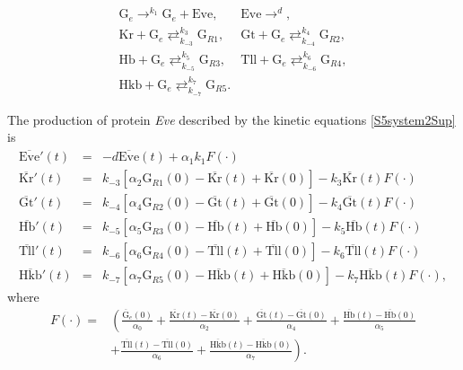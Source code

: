 \documentclass[final,authoryear, 5p, times]{elsarticle}
\begin{document}
\begin{equation}  \label{S5system2Sup}
    \begin{array}{ll}
        \displaystyle
        \text{G}_e \mathop{\longrightarrow}^{k_{1}} \text{G}_e + \text{Eve}, & \displaystyle
        \text{Eve} \mathop{\longrightarrow}^{d}, \\ \displaystyle
        \text{Kr} + \text{G}_e \mathop{\rightleftarrows}^{k_{3}}_{k_{-3}} \text{G}_{R1} ,& \displaystyle
        \text{Gt} + \text{G}_e \mathop{\rightleftarrows}^{k_{4}}_{k_{-4}} \text{G}_{R2}, \\ \displaystyle
        \text{Hb} + \text{G}_e \mathop{\rightleftarrows}^{k_{5}}_{k_{-5}} \text{G}_{R3}, & \displaystyle
        \text{Tll} + \text{G}_e \mathop{\rightleftarrows}^{k_{6}}_{k_{-6}} \text{G}_{R4},\\ \displaystyle
        \text{Hkb} + \text{G}_e \mathop{\rightleftarrows}^{k_{7}}_{k_{-7}} \text{G}_{R5} .&
    \end{array}
\end{equation}

The production of protein \textit{Eve} described by the kinetic equations \eqref{S5system2Sup} is
$$
\begin{array}{lcl}
    \overline{\text{Eve}}'(t) &= & -d \overline{\text{Eve}}(t) + \alpha_1 k_1F(\cdot)\\
        \overline{\text{Kr}}'(t)&=&k_{-3}  \left[\alpha _2 \text{G}_{R1}(0)- \overline{\text{Kr}}(t)+\overline{\text{Kr}}(0)\right]- k_3 \overline{\text{Kr}}(t) F(\cdot)\\[5pt]
    \overline{\text{Gt}}'(t)&=& k_{-4} \left[\alpha_4 \text{G}_{R2}(0) -\overline{\text{Gt}}(t)+\overline{\text{Gt}}(0)\right]- k_4  \overline{\text{Gt}}(t) F(\cdot)\\  [5pt]
        \overline{\text{Hb}}'(t)&=&k_{-5} \left[\alpha_5 \text{G}_{R3}(0)- \overline{\text{Hb}}(t)+\overline{\text{Hb}}(0)\right]-k_5 \overline{\text{Hb}}(t) F(\cdot)\\[5pt]
    \overline{\text{Tll}}'(t)&=& k_{-6} \left[\alpha_6 \text{G}_{R4}(0)-\overline{\text{Tll}}(t)+\overline{\text{Tll}}(0)\right]- k_6 \overline{\text{Tll}}(t) F(\cdot)\\[5pt]
        \overline{\text{Hkb}}'(t)&=&k_{-7}  \left[\alpha_7 \text{G}_{R5}(0)- \overline{\text{Hkb}}(t)+\overline{\text{Hkb}}(0)\right]- k_7 \overline{\text{Hkb}}(t) F(\cdot),
\end{array}
$$
where
\scriptsize{$$
\begin{array}{ll}
F(\cdot)= & \left(\frac{\overline{\text{G}}_e(0)}{\alpha_0} + \frac{\overline{\text{Kr}}(t)-\overline{\text{Kr}}(0)}{\alpha_2} +\frac{\overline{\text{Gt}}(t)-\overline{\text{Gt}}(0)}{\alpha_4}+\frac{\overline{\text{Hb}}(t)-\overline{\text{Hb}}(0)}{\alpha_5}\right. \\ &\left. +\frac{\overline{\text{Tll}}(t)-\overline{\text{Tll}}(0)}{\alpha_6} +\frac{\overline{\text{Hkb}}(t)-\overline{\text{Hkb}}(0)}{\alpha_7}   \right).
\end{array}
$$}
\end{document}
